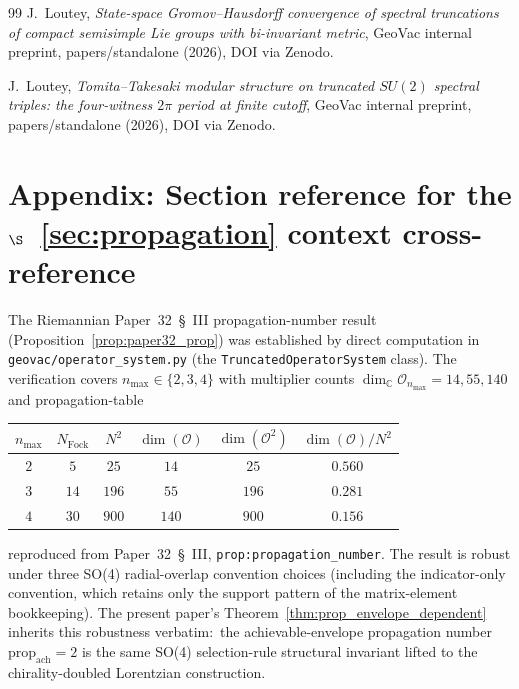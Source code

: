 \documentclass[11pt,a4paper]{article}
\theoremstyle{plain}
\theoremstyle{definition}
\newcommand{\nmax}{n_{\max}}
\newcommand{\Op}{\mathcal{O}}
\newcommand{\C}{\mathbb{C}}
\newcommand{\prop}{\mathrm{prop}}
\newcommand{\achievable}{\mathrm{ach}}
\begin{document}
\begin{thebibliography}{99}
J.~Loutey,
\newblock \emph{State-space Gromov--Hausdorff convergence of spectral
truncations of compact semisimple Lie groups with bi-invariant metric},
\newblock GeoVac internal preprint, papers/standalone (2026),
DOI via Zenodo.

J.~Loutey,
\newblock \emph{Tomita--Takesaki modular structure on truncated
$SU(2)$ spectral triples: the four-witness $2\pi$ period at finite
cutoff},
\newblock GeoVac internal preprint, papers/standalone (2026),
DOI via Zenodo.

\end{thebibliography}

\section*{Appendix: Section reference for the \texorpdfstring{$\S$~\ref{sec:propagation}}{Sec. 5} context cross-reference}
\label{sec:context}

The Riemannian Paper~32~\S~III propagation-number result
(Proposition~\ref{prop:paper32_prop}) was established by direct
computation in \texttt{geovac/operator\_system.py} (the
\texttt{TruncatedOperatorSystem} class). The verification covers
$\nmax \in \{2, 3, 4\}$ with multiplier counts
$\dim_\C \Op_{\nmax} = 14, 55, 140$ and propagation-table

\medskip
\begin{center}\renewcommand{\arraystretch}{1.20}
\begin{tabular}{c|c|c|c|c|c}
$\nmax$ & $N_{\mathrm{Fock}}$ & $N^2$ & $\dim(\Op)$ & $\dim(\Op^2)$
   & $\dim(\Op) / N^2$ \\
\hline
$2$ & $5$  & $25$  & $14$  & $25$  & $0.560$ \\
$3$ & $14$ & $196$ & $55$  & $196$ & $0.281$ \\
$4$ & $30$ & $900$ & $140$ & $900$ & $0.156$ \\
\end{tabular}
\end{center}
\medskip

reproduced from Paper~32~\S~III, \texttt{prop:propagation\_number}.
The result is robust under three SO(4) radial-overlap convention
choices (including the indicator-only convention, which retains only
the support pattern of the matrix-element bookkeeping). The
present paper's Theorem~\ref{thm:prop_envelope_dependent} inherits
this robustness verbatim:\ the achievable-envelope propagation number
$\prop_\achievable = 2$ is the same SO(4) selection-rule structural
invariant lifted to the chirality-doubled Lorentzian construction.
\end{document}
